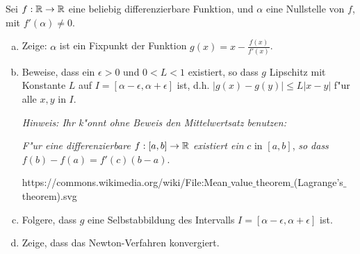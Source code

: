 \documentclass[a4paper,10pt]{article}
\begin{document}
\begin{Aufg}
 Sei $f: \mathbb{R} \to \mathbb{R}$ eine beliebig differenzierbare Funktion, und $\alpha$ eine Nullstelle von $f$,
 mit $f'(\alpha) \neq 0$.
 \begin{enumerate}[(a)]
  \item Zeige: $\alpha$ ist ein Fixpunkt der Funktion $g(x)= x - \frac{f(x)}{f'(x)}$.
  \item Beweise, dass ein $\epsilon > 0$ und $0<L<1$ existiert, so dass $g$ Lipschitz 
  mit Konstante $L$ auf 
  $I=\left[ \alpha - \epsilon , \alpha + \epsilon \right]$ ist, d.h. 
  $|g(x) - g(y)| \leq L|x-y|$ f"ur alle $x,y$ in $I$.
  
  
  \textit{
  Hinweis: Ihr k"onnt ohne Beweis den Mittelwertsatz benutzen: }
  
\textit{  F"ur eine differenzierbare}
  $f:\left[ a, b \right] \to \mathbb{R}$ \textit{existiert ein }$c$ in $\left[ a, b \right]$,
  \textit{so dass}
  $f(b) - f(a) = f'(c)(b-a)$.
  \begin{center}
 
 
 \tiny 
 https://commons.wikimedia.org/wiki/File:Mean$\_$value$\_$theorem$\_$(Lagrange's$\_$theorem).svg
\end{center}
 
  
  \item Folgere, dass $g$ eine Selbstabbildung des Intervalls
  $I=\left[ \alpha - \epsilon , \alpha + \epsilon \right]$ ist.
  \item Zeige, dass das Newton-Verfahren konvergiert.
 \end{enumerate}

\end{Aufg}
\end{document}
